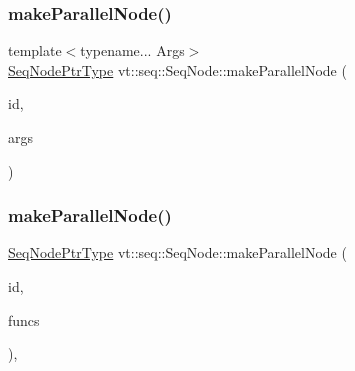 \mbox{\label{structvt_1_1seq_1_1_seq_node_aa7b64d1e28e2516f7041d0f682ea6d5a}} 
\subsubsection{\texorpdfstring{make\+Parallel\+Node()}{makeParallelNode()}\hspace{0.1cm}{\footnotesize\ttfamily [1/2]}}
{\footnotesize\ttfamily template$<$typename... Args$>$ \\
\hyperlink{namespacevt_1_1seq_ae6a4874b585be0612aaca32ca6d2d191}{Seq\+Node\+Ptr\+Type} vt\+::seq\+::\+Seq\+Node\+::make\+Parallel\+Node (\begin{DoxyParamCaption}\item[{\hyperlink{namespacevt_1_1seq_a3b612da217ac669d39c159f134ab8434}{Seq\+Type} const \&}]{id,  }\item[{Args \&\&...}]{args }\end{DoxyParamCaption})\hspace{0.3cm}{\ttfamily [static]}}

\mbox{\label{structvt_1_1seq_1_1_seq_node_a6f750e19fb10c44756874ec41c1de31b}} 
\subsubsection{\texorpdfstring{make\+Parallel\+Node()}{makeParallelNode()}\hspace{0.1cm}{\footnotesize\ttfamily [2/2]}}
{\footnotesize\ttfamily \hyperlink{namespacevt_1_1seq_ae6a4874b585be0612aaca32ca6d2d191}{Seq\+Node\+Ptr\+Type} vt\+::seq\+::\+Seq\+Node\+::make\+Parallel\+Node (\begin{DoxyParamCaption}\item[{\hyperlink{namespacevt_1_1seq_a3b612da217ac669d39c159f134ab8434}{Seq\+Type} const \&}]{id,  }\item[{\hyperlink{namespacevt_1_1seq_a3d4575155fb9c0aeeb30b089adfdd04d}{Seq\+Func\+Container\+Type} const \&}]{funcs }\end{DoxyParamCaption})\hspace{0.3cm}{\ttfamily [inline]}, {\ttfamily [static]}}

